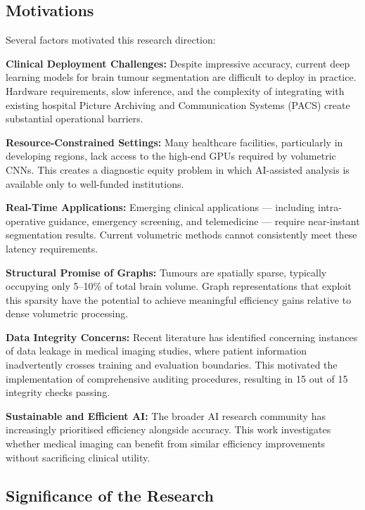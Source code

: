 \documentclass{article}
\begin{document}
 
\subsection{Motivations}

Several factors motivated this research direction:

\textbf{Clinical Deployment Challenges:} Despite impressive accuracy, current deep learning models for brain tumour segmentation are difficult to deploy in practice. Hardware requirements, slow inference, and the complexity of integrating with existing hospital Picture Archiving and Communication Systems (PACS) create substantial operational barriers.

\textbf{Resource-Constrained Settings:} Many healthcare facilities, particularly in developing regions, lack access to the high-end GPUs required by volumetric CNNs. This creates a diagnostic equity problem in which AI-assisted analysis is available only to well-funded institutions.

\textbf{Real-Time Applications:} Emerging clinical applications — including intra-operative guidance, emergency screening, and telemedicine — require near-instant segmentation results. Current volumetric methods cannot consistently meet these latency requirements.

\textbf{Structural Promise of Graphs:} Tumours are spatially sparse, typically occupying only 5--10\% of total brain volume. Graph representations that exploit this sparsity have the potential to achieve meaningful efficiency gains relative to dense volumetric processing.

\textbf{Data Integrity Concerns:} Recent literature has identified concerning instances of data leakage in medical imaging studies, where patient information inadvertently crosses training and evaluation boundaries. This motivated the implementation of comprehensive auditing procedures, resulting in 15 out of 15 integrity checks passing.

\textbf{Sustainable and Efficient AI:} The broader AI research community has increasingly prioritised efficiency alongside accuracy. This work investigates whether medical imaging can benefit from similar efficiency improvements without sacrificing clinical utility.


\subsection{Significance of the Research}
\end{document}
